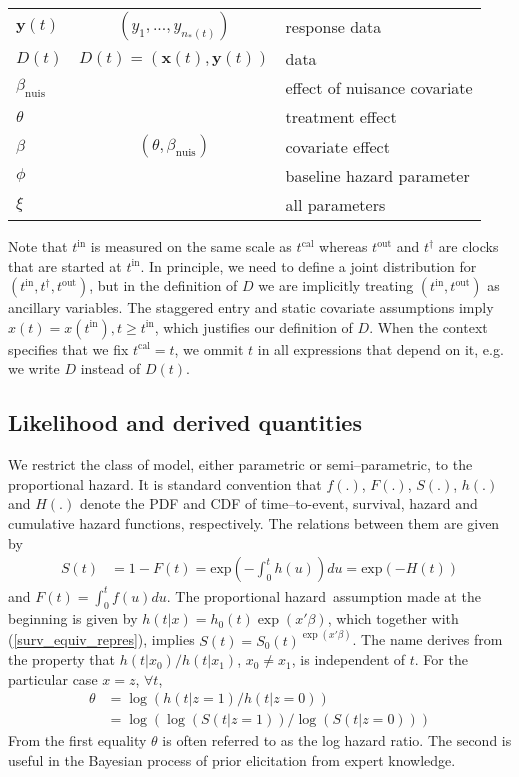 \documentclass{article}
\newcommand{\tcal}{t^{\mathrm{cal}}}
\newcommand{\tfail}{t^{\dag}}
\newcommand{\tentry}{t^{\mathrm{in}}}
\newcommand{\texit}{t^{\mathrm{out}}}
\newcommand{\survresp}{y}
\newcommand{\survfullcov}{x}
\newcommand{\nentries}{n_*}
\newcommand{\survdata}{D}
\newcommand{\survdatadef}{data}
\newcommand{\survdataformula}[1]{D(#1)=(\survcovmat(#1),\survrespmat(#1))}
\newcommand{\survcovmat}{\mathbf{x}}
\newcommand{\survrespmat}{\mathbf{y}}
\newcommand{\survrespmatdef}{response data}
\newcommand{\survrespmatformula}[1]{(\survresp_1,...,\survresp_{\nentries(#1)})}
\newcommand{\basehazard}{h_{0}}
\newcommand{\hazard}{h}
\newcommand{\cumHazard}{H}
\newcommand{\basesurv}{S_{0}}
\newcommand{\surv}{S}
\newcommand{\treatindic}{z}
\newcommand{\treateffect}{\theta}
\newcommand{\treateffectdef}{treatment effect}
\newcommand{\survnuiseffect}{\beta_{\mathrm{nuis}}}
\newcommand{\survnuiseffectdef}{effect of nuisance covariate}
\newcommand{\survfulleffect}{\beta}
\newcommand{\survfulleffectformula}{(\treateffect,\survnuiseffect)}
\newcommand{\survfulleffectdef}{covariate effect}
\newcommand{\survfullpar}{\xi}
\newcommand{\survfullpardef}{all parameters}
\newcommand{\survbasepar}{\phi}
\newcommand{\survbasepardef}{baseline hazard parameter}
\newcommand{\ph}{proportional hazard}
\begin{document}
\begin{center}
\begin{tabular}{|l|c|l|}
$\survrespmat(t)$ & $\survrespmatformula{t}$ & \survrespmatdef\\
$\survdata(t)$ & $\survdataformula{t}$& \survdatadef\\\hline
$\survnuiseffect$ & & \survnuiseffectdef\\
$\treateffect$& &\treateffectdef\\
$\survfulleffect$& $\survfulleffectformula$ &\survfulleffectdef\\
$\survbasepar$& &\survbasepardef\\
$\survfullpar$& &\survfullpardef\\
\hline
\end{tabular}
\end{center}Note that $\tentry$ is measured on the same scale as $\tcal$ whereas $\texit$ and $\tfail$ are clocks that are started at $\tentry$. In principle, we need to define a joint distribution for $(\tentry,\tfail,\texit)$, but in the definition of $\survdata$ we are implicitly treating $(\tentry,\texit)$ as ancillary variables. The staggered entry and static covariate assumptions imply $\survfullcov(t)=\survfullcov(\tentry),t\geq\tentry$, which justifies our definition of $\survdata$. When the context specifies that we fix $\tcal=t$, we ommit $t$ in all expressions that depend on it, e.g. we write $\survdata$ instead of $\survdata(t)$.

\subsection{Likelihood and derived quantities}
We restrict the class of model, either parametric or semi--parametric, to the \ph. It is standard convention that $f(.)$, $F(.)$, $\surv(.)$, $\hazard(.)$ and $\cumHazard(.)$ denote the PDF and CDF of time--to-event, survival, hazard and cumulative hazard functions, respectively. The relations between them are given by
\begin{align}\label{surv_equiv_repres}
\surv(t) &= 1-F(t) = \mathrm{exp}\left(-\int_0^t \hazard(u)\right) du = \mathrm{exp}(-\cumHazard(t))
\end{align}and $F(t)=\int_0^t f(u) du$. The \ph\ assumption made at the beginning is given by $\hazard(t|x)= \basehazard(t)\exp(x'\survfulleffect)$, which together with (\ref{surv_equiv_repres}), implies $\surv(t)=\basesurv(t)^{\exp(\survfullcov'\survfulleffect)}$. The name derives from the property that $\hazard(t|\survfullcov_0)/\hazard(t|\survfullcov_1)$, $\survfullcov_0\neq \survfullcov_1$, is independent of $t$. For the particular case $\survfullcov=\treatindic$, $\forall t$, \begin{align}\label{loghazardratio}
\treateffect&=\log(\hazard(t|\treatindic=1)/\hazard(t|\treatindic=0))\\\label{loglogsurvratio}
&=\log\left(\log(S(t|\treatindic=1))/\log(S(t|\treatindic=0))\right)
\end{align}From the first equality $\treateffect$ is often referred to as the log hazard ratio. The second is useful in the Bayesian process of prior elicitation from expert knowledge.
\end{document}

